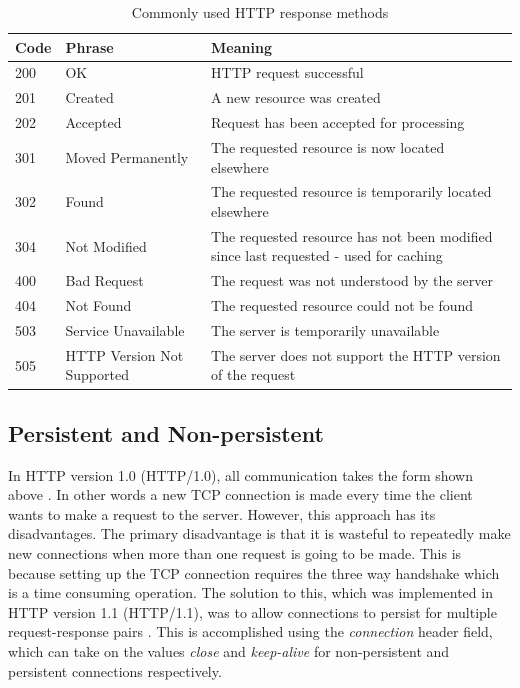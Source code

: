 \documentclass[10pt,twocolumn]{witseiepaper}
\begin{document}
	\begin{table}[tb]
		\centering
		\caption{Commonly used HTTP response methods}
		\label{httpresps}
		\begin{tabular}{p{}|p{}|p{}}
			\hline
			\textbf{Code} & \textbf{Phrase} & \textbf{Meaning} \\ \hline
			200 & OK & HTTP request successful \\
			201 & Created & A new resource was created \\
			202 & Accepted & Request has been accepted for processing \\
			301 & Moved Permanently & The requested resource is now located elsewhere \\
			302 & Found & The requested resource is temporarily located elsewhere \\
			304 & Not Modified & The requested resource has not been modified since last requested - used for caching \\
			400 & Bad Request & The request was not understood by the server \\
			404 & Not Found & The requested resource could not be found \\
			503 & Service Unavailable & The server is temporarily unavailable \\
			505 & HTTP Version Not Supported & The server does not support the HTTP version of the request \\
			\hline
		\end{tabular}
	\end{table}

	\subsection{Persistent and Non-persistent} \label{pvnp}

	In HTTP version 1.0 (HTTP/1.0), all communication takes the form shown above \cite{rfc1945}. In other words a new TCP connection is made every time the client wants to make a request to the server. However, this approach has its disadvantages. The primary disadvantage is that it is wasteful to repeatedly make new connections when more than one request is going to be made. This is because setting up the TCP connection requires the three way handshake which is a time consuming operation. The solution to this, which was implemented in HTTP version 1.1 (HTTP/1.1), was to allow connections to persist for multiple request-response pairs \cite{rfc7230}. This is accomplished using the \emph{connection} header field, which can take on the values \emph{close} and \emph{keep-alive} for non-persistent and persistent connections respectively.
\end{document}
